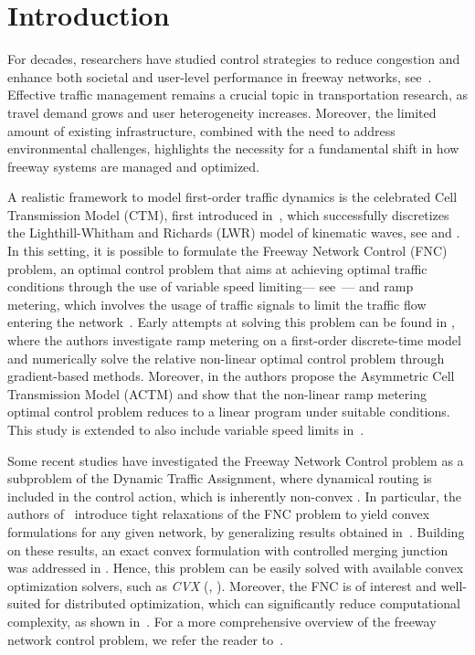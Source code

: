 \documentclass[preprint,12pt]{elsarticle}
\begin{document}
\section{Introduction}
For decades, researchers have studied control strategies to reduce congestion and enhance both societal and user-level performance in freeway networks, see~\cite{Peeta:2001}. Effective traffic management remains a crucial topic in transportation research, as travel demand grows and user heterogeneity increases. Moreover, the limited amount of existing infrastructure, combined with the need to address environmental challenges, highlights the necessity for a fundamental shift in how freeway systems are managed and optimized. 

A realistic framework to model first-order traffic dynamics is the celebrated Cell Transmission Model (CTM), first introduced in~\cite{DAG1, DAG2}, which successfully discretizes the Lighthill-Whitham and Richards (LWR) model of kinematic waves, see \cite{KynWave} and \cite{KynWave2}. In this setting, it is possible to formulate the Freeway Network Control (FNC) problem, an optimal control problem that aims at achieving optimal traffic conditions through the use of variable speed limiting--- see~\cite{VLS1,VLS2}--- and ramp metering, which involves the usage of traffic signals to limit the traffic flow entering the network~\cite{Gomes:2006,Mura:2012,Schmitt:2017}. Early attempts at solving this problem can be found in \cite{Zhang1996,Zhang1999}, where the authors investigate ramp metering on a first-order discrete-time model and numerically solve the relative non-linear optimal control problem through gradient-based methods. Moreover, in \cite{Gomes:2006} the authors propose the Asymmetric Cell Transmission Model (ACTM) and show that the non-linear ramp metering optimal control problem reduces to a linear program under suitable conditions. This study is extended to also include variable speed limits in~\cite{Mura2012}. 

Some recent studies have investigated the Freeway Network Control problem as a subproblem of the Dynamic Traffic Assignment, where dynamical routing is included in the control action, which is inherently non-convex \cite{Non-Conv}. In particular, the authors of~\cite{ConvAndRob,ConvAndRob2} introduce tight relaxations of the FNC problem to yield convex formulations for any given network, by generalizing results obtained in~\cite{Zili:2000}. Building on these results, an exact convex formulation with controlled merging junction was addressed in \cite{Schmitt2018}.
Hence, this problem can be easily solved with available convex optimization solvers, such as \textit{CVX} (\cite{cvx}, \cite{gb08}). Moreover, the FNC is of interest and well-suited for distributed optimization, which can significantly reduce computational complexity, as shown in~\cite{Distr,Distr2}. For a more comprehensive overview of the freeway network
 control problem, we refer the reader to~\cite{Siri2011}.
\end{document}
